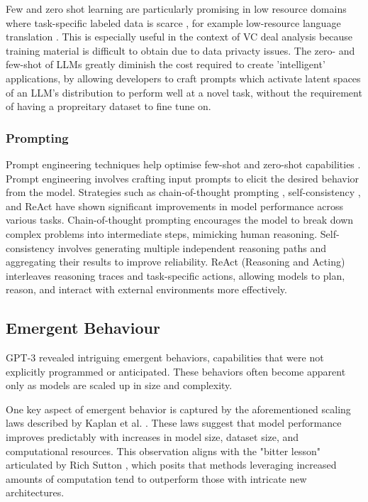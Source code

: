 \documentclass[a4paper, oneside]{discothesis}
\begin{document}
Few and zero shot learning are particularly promising in low resource domains where task-specific labeled data is scarce \cite{hedderich2021survey}, for example low-resource language translation \cite{garcia2020multilingual}. This is especially useful in the context of VC deal analysis because training material is difficult to obtain due to data privacty issues. The zero- and few-shot  of LLMs greatly diminish the cost required to create 'intelligent' applications, by allowing developers to craft prompts which activate latent spaces of an LLM's distribution to perform well at a novel task, without the requirement of having a propreitary dataset to fine tune on.

\subsubsection{Prompting}

Prompt engineering techniques help optimise few-shot and zero-shot capabilities \cite{liu2021pre}. 
Prompt engineering involves crafting input prompts to elicit the desired behavior from the model. 
Strategies such as chain-of-thought prompting \cite{wei2022chain}, self-consistency \cite{wang2022self}, and ReAct \cite{yao2023react} have shown significant improvements in model performance across various tasks. Chain-of-thought prompting encourages the model to break down complex problems into intermediate steps, mimicking human reasoning. Self-consistency involves generating multiple independent reasoning paths and aggregating their results to improve reliability. ReAct (Reasoning and Acting) interleaves reasoning traces and task-specific actions, allowing models to plan, reason, and interact with external environments more effectively.

\subsection{Emergent Behaviour}
GPT-3 revealed intriguing emergent behaviors, capabilities that were not explicitly programmed or anticipated. These behaviors often become apparent only as models are scaled up in size and complexity.

One key aspect of emergent behavior is captured by the aforementioned scaling laws described by Kaplan et al. \cite{kaplan2020scaling}. These laws suggest that model performance improves predictably with increases in model size, dataset size, and computational resources. This observation aligns with the "bitter lesson" articulated by Rich Sutton \cite{sutton2019bitter}, which posits that methods leveraging increased amounts of computation tend to outperform those with intricate new architectures.
\end{document}
